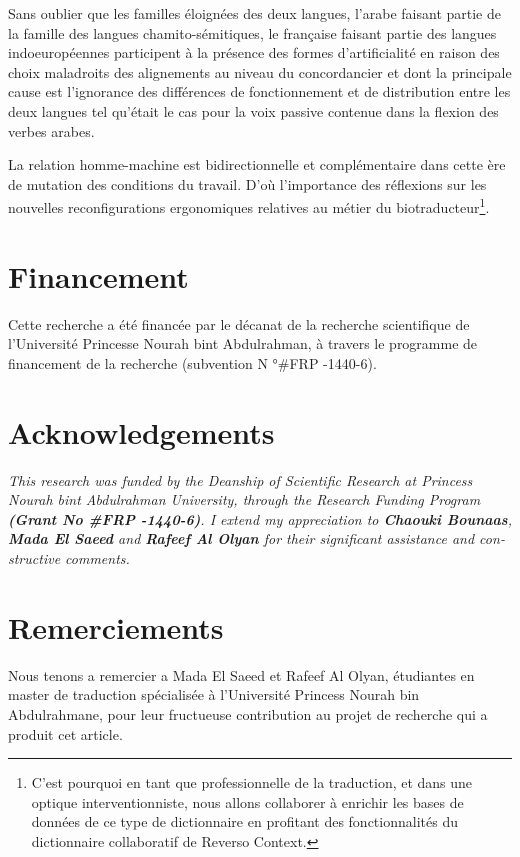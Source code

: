 \documentclass[french]{textolivre}
\begin{document}
Sans oublier que les familles éloignées des deux langues, l’arabe faisant partie de la famille des langues chamito-sémitiques, le française faisant partie des langues indoeuropéennes participent à la présence des formes d’artificialité en raison des choix maladroits des alignements au niveau du concordancier et dont la principale cause est l’ignorance des différences de fonctionnement et de distribution entre les deux langues tel qu’était le cas pour la voix passive contenue dans la flexion des verbes arabes.

La relation homme-machine est bidirectionnelle et complémentaire dans cette ère de mutation des conditions du travail. D’où l’importance des réflexions sur les nouvelles reconfigurations ergonomiques relatives au métier du biotraducteur\footnote{C’est pourquoi en tant que professionnelle de la traduction, et dans une optique interventionniste, nous allons collaborer à enrichir les bases de données de ce type de dictionnaire en profitant des fonctionnalités du dictionnaire collaboratif de Reverso Context.}.

\section*{Financement}
Cette recherche a été financée par le décanat de la recherche scientifique de l’Université Princesse Nourah bint Abdulrahman, à travers le programme de financement de la recherche (subvention N °\#FRP -1440-6).

\section*{Acknowledgements}
\begin{english}
\textit{
This research was funded by the Deanship of Scientific Research at Princess Nourah bint Abdulrahman University, 
through the Research Funding Program \textbf{(Grant No \#FRP -1440-6)}. 
I extend my appreciation to \textbf{Chaouki Bounaas}, \textbf{Mada El Saeed} and \textbf{Rafeef Al Olyan}
for their significant assistance and constructive comments.
}
\end{english}


\section*{Remerciements}
Nous tenons a remercier a Mada El Saeed et Rafeef Al Olyan, étudiantes en master de traduction spécialisée à l’Université Princess Nourah bin Abdulrahmane, pour leur fructueuse contribution au projet de recherche qui a produit cet article.

\begin{portuguese}
\printbibliography[title={Références}]
\end{portuguese}
\end{document}
